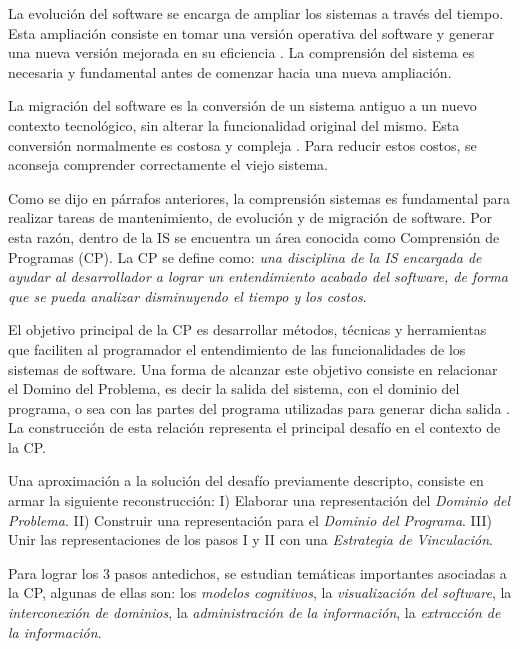 \documentclass[a4paper,12pt]{report}
\begin{document}
\hspace{0.5cm} La evolución del software se encarga de ampliar los sistemas a través del tiempo. Esta ampliación consiste en tomar una versión operativa del software y generar una nueva versión mejorada en su eficiencia \cite{KBVR00}. La comprensión del sistema es necesaria y fundamental antes de comenzar hacia una nueva ampliación.

\hspace{0.5cm} La migración del software es la conversión de un sistema antiguo a un nuevo contexto tecnológico, sin alterar la funcionalidad original del mismo. Esta conversión normalmente es costosa y compleja \cite{MMFAF08}. Para reducir estos costos, se aconseja comprender correctamente el viejo sistema.

\hspace{0.5cm} Como se dijo en párrafos anteriores, la comprensión sistemas es fundamental para realizar tareas de mantenimiento, de evolución y de migración de software. Por esta razón, dentro de la IS se encuentra un área conocida como Comprensión de Programas (CP). La CP se define como: \textit{una disciplina de la IS encargada de ayudar al
desarrollador a lograr un entendimiento acabado del software, de forma que se pueda analizar disminuyendo el tiempo y los costos}. 

\hspace{0.5cm} El objetivo principal de la CP  \cite{BRM10,MPMR07,MBPHRU10,MAS05} es desarrollar métodos, técnicas y herramientas que faciliten al programador 
el entendimiento de las funcionalidades de los sistemas de software.
Una forma de alcanzar este objetivo consiste en relacionar el Domino del Problema, 
es decir la salida del sistema, con el dominio del programa, o sea 
con las partes del programa utilizadas para generar dicha salida \cite{VMAVA95,MPOB03,BROOK82,AMPM11}.
La construcción de esta relación representa el principal desafío en el contexto de la 
CP. 

\hspace{0.5cm} Una aproximación a la solución del desafío previamente descripto, consiste en armar la siguiente reconstrucción:
I) Elaborar una representación del \textit{Dominio del Problema}. II) Construir una representación para el \textit{Dominio del Programa}. III) Unir las representaciones de los pasos I y II con una \textit{Estrategia de Vinculación}.

\hspace{0.5cm} Para lograr los 3 pasos antedichos, se estudian temáticas importantes asociadas a la CP, algunas de ellas son: los \textit{modelos cognitivos}, la \textit{visualización del software}, la \textit{interconexión de dominios}, la \textit{administración de la información}, la \textit{extracción de la información}. 
\end{document}
